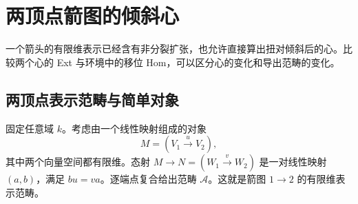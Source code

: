 
\section{两顶点箭图的倾斜心}
\label{b4:sec:1905}

一个箭头的有限维表示已经含有非分裂扩张，也允许直接算出扭对倾斜后的心。比较两个心的 Ext 与环境中的移位 Hom，可以区分心的变化和导出范畴的变化。


%
%

\subsection{两顶点表示范畴与简单对象}
\label{b4:subsec:1905:01}

固定任意域 \(k\)。考虑由一个线性映射组成的对象
\[
	M=(V_1\xrightarrow{u}V_2),
\]
其中两个向量空间都有限维。态射 \(M\to N=(W_1\xrightarrow{v}W_2)\) 是一对线性映射 \((a,b)\)，满足 \(bu=va\)。逐端点复合给出范畴 \(\mathcal A\)。这就是箭图 \(1\to2\) 的有限维表示范畴。

